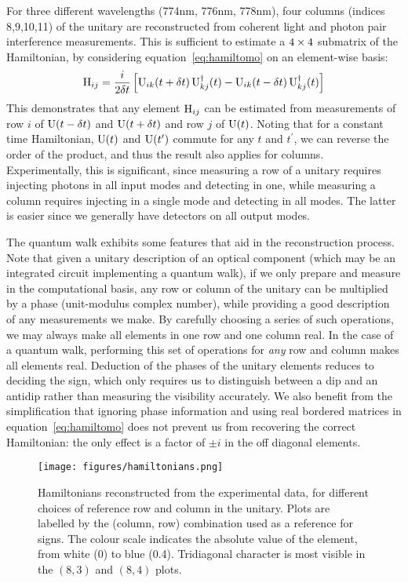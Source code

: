 For three different wavelengths (774nm, 776nm, 778nm), four columns (indices
8,9,10,11) of the unitary are reconstructed from coherent light and photon pair
interference measurements. This is sufficient to estimate a \(4 \times 4\)
submatrix of the Hamiltonian, by considering equation~\ref{eq:hamiltomo} on an
element-wise basis:
\begin{equation}
  \mathrm{H}_{ij} = \frac{i}{2 \delta t} \left[ \mathrm{U}_{ik} \!\left( t+\delta t \right) \mathrm{U}_{kj}^{
  \dagger} \!\left(t\right) - \mathrm{U}_{ik} \!\left( t-\delta t \right) \mathrm{U}_{kj}^{\dagger} \!\left(t\right)
  \right]
\end{equation}
This demonstrates that any element \(\mathrm{H}_{ij}\) can be estimated from
measurements of row \(i\) of \(\mathrm{U} \!\left(t-\delta t\right)\) and \(\mathrm{U} \!\left(t+\delta t\right)\)
and row \(j\) of \(\mathrm{U} \!\left(t\right)\). Noting that for a constant time
Hamiltonian, \(\mathrm{U} \!\left(t\right)\) and \(\mathrm{U} \!\left(t^{\prime}\right)\) commute for any
\(t\) and \(t^{\prime}\), we can reverse the order of the product, and thus the
result also applies for columns. Experimentally, this is significant, since
measuring a row of a unitary requires injecting photons in all input modes and
detecting in one, while measuring a column requires injecting in a single mode
and detecting in all modes. The latter is easier since we generally have
detectors on all output modes.

The quantum walk exhibits some features that aid in the reconstruction process.
Note that given a unitary description of an optical component (which may be an
integrated circuit implementing a quantum walk), if we only prepare and measure
in the computational basis, any row or column of the unitary can be multiplied
by a phase (unit-modulus complex number), while providing a good description
of any measurements we make. By carefully choosing a series of such operations,
we may always make all elements in one row and one column real. In the case of a
quantum walk, performing this set of operations for \emph{any} row and column
makes all elements real. Deduction of the phases of the unitary
elements reduces to deciding the sign, which only requires us to distinguish
between a dip and an antidip rather than measuring the visibility accurately. We
also benefit from the simplification that ignoring phase information and using
real bordered matrices in equation~\ref{eq:hamiltomo} does not prevent us from
recovering the correct Hamiltonian: the only effect is a factor of \(\pm i\) in
the off diagonal elements.

\begin{figure}
  \centering
  \texttt{[image: figures/hamiltonians.png]}
  \caption[Reconstructed Hamiltonians]
  {Hamiltonians reconstructed from the experimental data, for different choices
  of reference row and column in the unitary. Plots are labelled by the (column,
  row) combination used as a reference for signs. The colour scale indicates the
  absolute value of the element, from white (0) to blue (0.4). Tridiagonal
  character is most visible in the \(\left(8,3\right)\) and \(\left(8,4\right)\)
  plots.}
  \label{fig:hamiltonians}
\end{figure}

